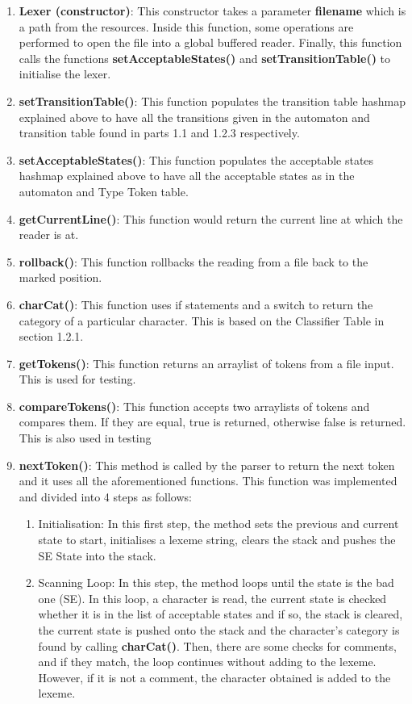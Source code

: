 \documentclass{article}
\begin{document}
					
					\begin{enumerate}
						\item \textbf{Lexer (constructor)}: This constructor takes a parameter \textbf{filename} which is a path from the resources. Inside this function, some operations are performed to open the file into a global buffered reader. Finally, this function calls the functions \textbf{setAcceptableStates()} and  \textbf{setTransitionTable()} to initialise the lexer.
						\item \textbf{setTransitionTable()}: This function populates the transition table hashmap explained above to have all the transitions given in the automaton and transition table found in parts 1.1 and 1.2.3 respectively.
						\item \textbf{setAcceptableStates()}: This function populates the acceptable states hashmap explained above to have all the acceptable states as in the automaton and Type Token table.
						\item \textbf{getCurrentLine()}: This function would return the current line at which the reader is at.
						\item \textbf{rollback()}: This function rollbacks the reading from a file back to the marked position.
						\item \textbf{charCat()}: This function uses if statements and a switch to return the category of a particular character. This is based on the Classifier Table in section 1.2.1.
						\item \textbf{getTokens()}: This function returns an arraylist of tokens from a file input. This is used for testing.
						\item \textbf{compareTokens()}: This function accepts two arraylists of tokens and compares them. If they are equal, true is returned, otherwise false is returned. This is also used in testing
						\item \textbf{nextToken()}: This method is called by the parser to return the next token and it uses all the aforementioned functions. 
						This function was implemented and divided into 4 steps as follows:
						\begin{enumerate}
						\item Initialisation: In this first step, the method sets the previous and current state to start, initialises a lexeme string, clears the stack and pushes the SE State into the stack. 
						\item Scanning Loop: In this step, the method loops until the state is the bad one (SE). In this loop, a character is read, the current state is checked whether it is in the list of acceptable states and if so, the stack is cleared, the current state is pushed onto the stack and the character's category is found by calling \textbf{charCat()}. Then, there are some checks for comments, and if they match, the loop continues without adding to the lexeme. However, if it is not a comment, the character obtained is added to the lexeme.

\end{enumerate}
\end{enumerate}
\end{document}
